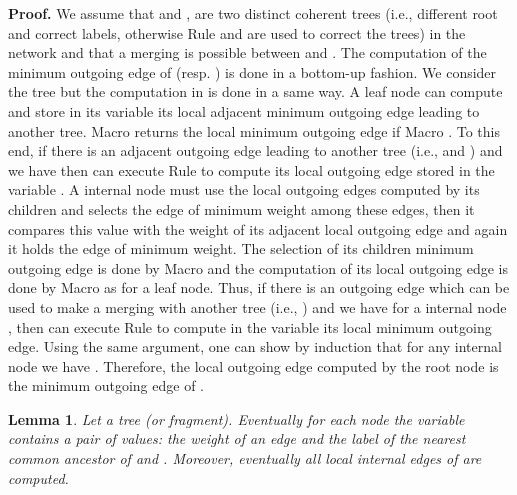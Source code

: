 \documentclass[11pt,a4paper]{article}
\newtheorem{lemma}{Lemma}
\newenvironment{proof}{\noindent \begin{rm}{\textbf{Proof.} }}{\hspace*{\fill}\par\end{rm}}
\begin{document}
\begin{proof}
We assume that  and ,  are two distinct coherent trees (i.e., different root and correct labels, otherwise Rule  and  are used to correct the trees) in the network and that a merging is possible between  and . The computation of the minimum outgoing edge of  (resp. ) is done in a bottom-up fashion. We consider the tree  but the computation in  is done in a same way. A leaf node  can compute and store in its variable  its local adjacent minimum outgoing edge leading to another tree. Macro  returns the local minimum outgoing edge if Macro . To this end, if there is an adjacent outgoing edge  leading to another tree  (i.e.,  and ) and we have  then  can execute Rule  to compute its local outgoing edge stored in the variable . A internal node  must use the local outgoing edges computed by its children and selects the edge of minimum weight among these edges, then it compares this value with the weight of its adjacent local outgoing edge and again it holds the edge of minimum weight. The selection of its children minimum outgoing edge is done by Macro  and the computation of its local outgoing edge is done by Macro  as for a leaf node. Thus, if there is an outgoing edge which can be used to make a merging with another tree (i.e., ) and we have  for a internal node , then  can execute Rule  to compute in the variable  its local minimum outgoing edge. Using the same argument, one can show by induction that for any internal node  we have . Therefore, the local outgoing edge computed by the root node  is the minimum outgoing edge of .
\end{proof}

\begin{lemma}
\label{lem:recover_computation}
Let  a tree (or fragment). Eventually for each node  the variable  contains a pair of values: the weight of an edge  and the label of the nearest common ancestor of  and . Moreover, eventually all local internal edges of  are computed.
\end{lemma}
\end{document}
